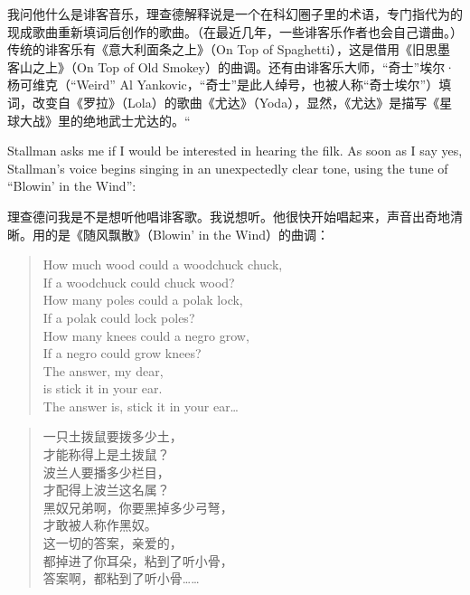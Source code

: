 \ifdefined\chs
我问他什么是诽客音乐，理查德解释说是一个在科幻圈子里的术语，专门指代为的现成歌曲重新填词后创作的歌曲。（在最近几年，一些诽客乐作者也会自己谱曲。）传统的诽客乐有《意大利面条之上》（On Top of Spaghetti），这是借用《旧思墨客山之上》（On Top of Old Smokey）的曲调。还有由诽客乐大师，“奇士”埃尔·杨可维克（“Weird” Al Yankovic，“奇士”是此人绰号，也被人称“奇士埃尔”）填词，改变自《罗拉》（Lola）的歌曲《尤达》（Yoda），显然，《尤达》是描写《星球大战》里的绝地武士尤达的。“
\fi

\ifdefined\eng
Stallman asks me if I would be interested in hearing the filk. As soon as I say yes, Stallman's voice begins singing in an unexpectedly clear tone, using the tune of ``Blowin' in the Wind'':
\fi

\ifdefined\chs
理查德问我是不是想听他唱诽客歌。我说想听。他很快开始唱起来，声音出奇地清晰。用的是《随风飘散》（Blowin' in the Wind）的曲调：
\fi

\ifdefined\eng
\begin{verse}
How much wood could a woodchuck chuck,\\
If a woodchuck could chuck wood?\\
How many poles could a polak lock,\\
If a polak could lock poles?\\
How many knees could a negro grow,\\
If a negro could grow knees?\\
The answer, my dear,\\
is stick it in your ear.\\
The answer is, stick it in your ear\ldots
\end{verse}
\fi

\ifdefined\chs
\begin{verse}
一只土拨鼠要拨多少土，\\
才能称得上是土拨鼠？\\
波兰人要播多少栏目，\\
才配得上波兰这名属？\\
黑奴兄弟啊，你要黑掉多少弓弩，\\
才敢被人称作黑奴。\\
这一切的答案，亲爱的，\\
都掉进了你耳朵，粘到了听小骨，\\
答案啊，都粘到了听小骨……
\end{verse}
\fi

